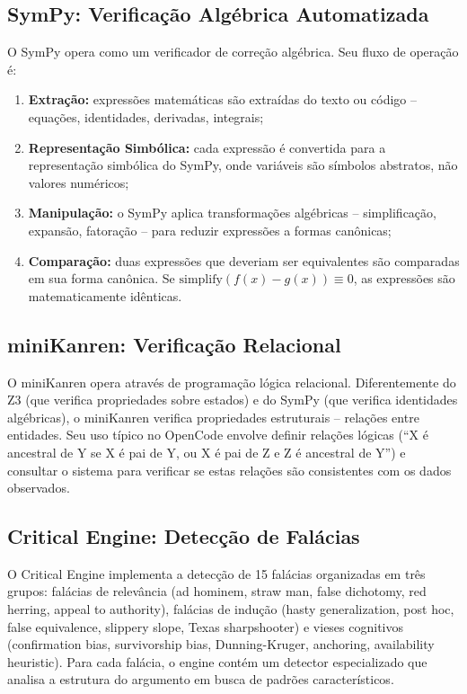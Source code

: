 \documentclass[12pt,a4paper,sumario=tradicional,openany]{abntex2}
\begin{document}
\subsection{SymPy: Verificação Algébrica Automatizada}

O SymPy opera como um verificador de correção algébrica. Seu fluxo de operação é:

\begin{enumerate}[leftmargin=*]
    \item \textbf{Extração:} expressões matemáticas são extraídas do texto ou código -- equações, identidades, derivadas, integrais;
    \item \textbf{Representação Simbólica:} cada expressão é convertida para a representação simbólica do SymPy, onde variáveis são símbolos abstratos, não valores numéricos;
    \item \textbf{Manipulação:} o SymPy aplica transformações algébricas -- simplificação, expansão, fatoração -- para reduzir expressões a formas canônicas;
    \item \textbf{Comparação:} duas expressões que deveriam ser equivalentes são comparadas em sua forma canônica. Se $\text{simplify}(f(x) - g(x)) \equiv 0$, as expressões são matematicamente idênticas.
\end{enumerate}

\subsection{miniKanren: Verificação Relacional}

O miniKanren opera através de programação lógica relacional. Diferentemente do Z3 (que verifica propriedades sobre estados) e do SymPy (que verifica identidades algébricas), o miniKanren verifica propriedades estruturais -- relações entre entidades. Seu uso típico no OpenCode envolve definir relações lógicas (``X é ancestral de Y se X é pai de Y, ou X é pai de Z e Z é ancestral de Y'') e consultar o sistema para verificar se estas relações são consistentes com os dados observados.

\subsection{Critical Engine: Detecção de Falácias}

O Critical Engine implementa a detecção de 15 falácias organizadas em três grupos: falácias de relevância (ad hominem, straw man, false dichotomy, red herring, appeal to authority), falácias de indução (hasty generalization, post hoc, false equivalence, slippery slope, Texas sharpshooter) e vieses cognitivos (confirmation bias, survivorship bias, Dunning-Kruger, anchoring, availability heuristic). Para cada falácia, o engine contém um detector especializado que analisa a estrutura do argumento em busca de padrões característicos.
\end{document}
